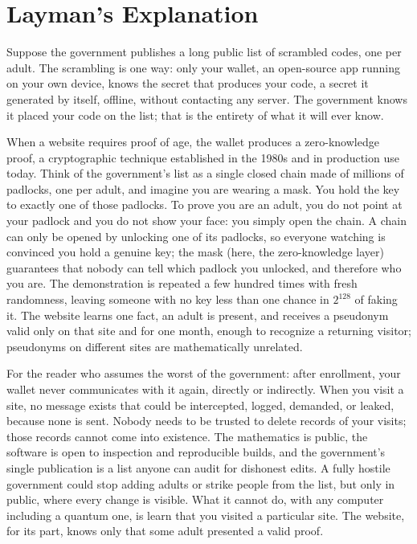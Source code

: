 \documentclass[11pt]{article}
\theoremstyle{definition}
\begin{document}
\section{Layman's Explanation}

Suppose the government publishes a long public list of scrambled codes, one per adult.
The
scrambling is one way: only your wallet, an open-source app running on your own device,
knows the secret that produces your code, a secret it generated by itself, offline,
without contacting any server. The government knows it placed your code on the list; that is
the entirety of what it will ever know.

When a website requires proof of age, the wallet produces a zero-knowledge proof, a
cryptographic technique established in the 1980s and in production use today. Think of
the government's list as a single closed chain made of millions of padlocks, one per
adult,
and imagine you are wearing a mask. You hold the key to exactly one of those padlocks. To
prove you are an adult, you do not point at your padlock and you do not show your face:
you simply open the chain. A chain can only be opened by unlocking one of its padlocks,
so everyone watching is convinced you hold a genuine key; the mask (here, the
zero-knowledge layer) guarantees that nobody can tell which padlock you unlocked, and
therefore who you are. The demonstration is repeated a few hundred times with fresh
randomness, leaving someone with no key less than one chance in $2^{128}$ of faking it.
The website learns one fact, an adult is present, and receives a pseudonym valid only on
that site and for one month, enough to recognize a returning visitor; pseudonyms on
different sites are mathematically unrelated.

For the reader who assumes the worst of the government: after enrollment, your wallet
never communicates with it again, directly or indirectly. When you visit a site, no
message exists that could be intercepted, logged, demanded, or leaked, because none is
sent. Nobody needs to be trusted to delete records of your visits; those records cannot
come into existence. The mathematics is public, the software is open to inspection and
reproducible builds, and the government's single publication is a list anyone can audit
for dishonest edits. A fully hostile government could stop adding adults or strike people
from the list, but only in public, where every change is visible. What it cannot do, with
any computer including a quantum one, is learn that you visited a particular site. The
website, for its part, knows only that some adult presented a valid proof.
\end{document}
